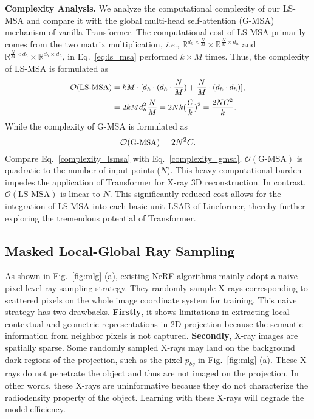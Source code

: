 \documentclass[10pt,twocolumn,letterpaper]{article}
\begin{document}
\vspace{2mm}
\noindent\textbf{Complexity Analysis.} We analyze the computational complexity of our LS-MSA and compare it with the global multi-head self-attention (G-MSA) mechanism of vanilla Transformer. The computational cost of LS-MSA primarily comes from the two matrix multiplication, \emph{i.e.}, $\mathbb{R}^{d_h \times \frac{N}{M}} \times \mathbb{R}^{\frac{N}{M} \times d_h}$ and $\mathbb{R}^{\frac{N}{M} \times d_h} \times \mathbb{R}^{d_h\times d_h}$, in Eq.~\eqref{eq:ls_msa} performed $k \times M$ times. Thus, the complexity of LS-MSA is formulated as
\vspace{0.4mm}
\begin{equation}
\small
\begin{aligned}
\mathcal{O}(\text{LS-MSA}) &= kM\cdot[d_h\cdot(d_h\cdot \frac{N}{M}) + \frac{N}{M}\cdot(d_h\cdot d_h)], \\
&= 2kMd_h^2\frac{N}{M} = 2Nk(\frac{C}{k})^2 = \frac{2NC^2}{k}.
\end{aligned}
\label{complexity_lsmsa}
\vspace{1.2mm}
\end{equation}
While the complexity of G-MSA is formulated as
\begin{equation}
\small
\mathcal{O}(\text{G-MSA}) = 2N^2C.
\label{complexity_gmsa}
\end{equation}
Compare Eq.~\eqref{complexity_lsmsa} with Eq.~\eqref{complexity_gmsa}. $\mathcal{O}(\text{G-MSA})$ is quadratic to the number of input points ($N$). This heavy computational burden impedes the application of Transformer for X-ray 3D reconstruction. In contrast, $\mathcal{O}(\text{LS-MSA})$ is linear to $N$. This significantly reduced cost allows for the integration of LS-MSA into each basic unit LSAB of Lineformer, thereby further exploring the tremendous potential of Transformer. 


\subsection{Masked Local-Global Ray Sampling}
As shown in Fig.~\ref{fig:mlg} (a), existing NeRF algorithms mainly adopt a naive pixel-level ray sampling strategy. They randomly sample X-rays corresponding to scattered pixels on the whole image coordinate system for training. This naive strategy has two drawbacks. \textbf{Firstly}, it shows limitations in extracting local contextual and geometric representations in 2D projection because the semantic information from neighbor pixels is not captured. \textbf{Secondly}, X-ray images are spatially sparse. Some randomly sampled X-rays may land on the background dark regions of the projection, such as the pixel $p_{bg}$ in Fig.~\ref{fig:mlg} (a). These X-rays do not penetrate the object and thus are not imaged on the projection. In other words, these X-rays are uninformative because they do not characterize the radiodensity property of the object. Learning with these X-rays will degrade the model efficiency.
\end{document}
